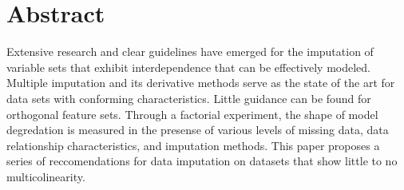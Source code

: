 \documentclass[../paper.tex]{subfiles}
\begin{document}
\section{Abstract}

Extensive research and clear guidelines have emerged for the imputation
of variable sets that exhibit interdependence that can be effectively modeled.
Multiple imputation and its derivative methods serve as the state of the art for
data sets with conforming characteristics. Little guidance can be found
for orthogonal feature sets. Through a factorial experiment, the shape of model
degredation is measured in the presense of various levels of missing data,
data relationship characteristics, and imputation methods.
This paper proposes a series of reccomendations for data imputation on datasets
that show little to no multicolinearity.
\end{document}
